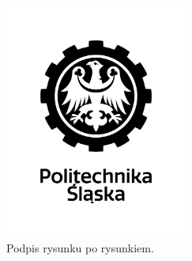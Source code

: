 \documentclass[a4paper,twoside,12pt]{book}
\begin{document}
\begin{figure}
\centering
\includegraphics[width=6cm]{logo_pl.jpg}
\caption{Podpis rysunku po rysunkiem.}
\label{fig:2}
\end{figure}
\end{document}
